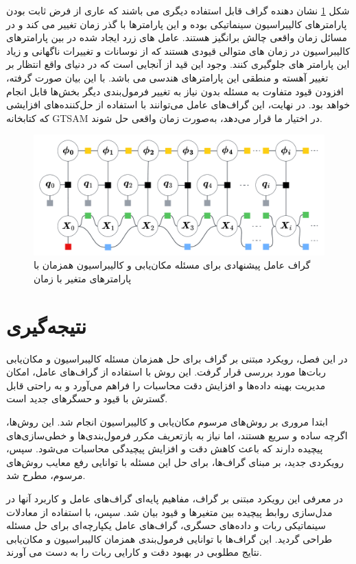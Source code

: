 شکل 
\ref{fig:kinematiclocalizationbasicnonstationatyparam}
نشان دهنده گراف قابل استفاده دیگری می باشند که عاری از فرض ثابت بودن پارامترهای کالیبراسیون سینماتیکی بوده و این پارامترها با گذر زمان تغییر می کند و در مسائل زمان واقعی چالش برانگیز هستند. عامل های زرد ایجاد شده در بین پارامترهای کالیبراسیون در زمان های متوالی قیودی هستند که از نوسانات و تغییرات ناگهانی و زیاد این پارامتر های جلوگیری کنند. وجود این قید از آنجایی است که در دنیای واقع انتظار بر تغییر آهسته و منطقی این پارامترهای هندسی می باشد. 
با این بیان صورت گرفته، افزودن قیود متفاوت به مسئله بدون نیاز به تغییر فرمول‌بندی دیگر بخش‌ها قابل انجام خواهد بود. در نهایت، این گراف‌های عامل می‌توانند با استفاده از حل‌کننده‌های افزایشی که کتابخانه GTSAM در اختیار ما قرار می‌دهد، به‌صورت زمان واقعی حل شوند. 
\begin{figure}[b]
	\centering
	\includegraphics[width=0.8\linewidth]{img/Kinematic_localization_basic_nonstationaty_param}
	\caption{گراف عامل پیشنهادی برای مسئله مکان‌یابی و کالیبراسیون همزمان با پارامتر‌های متغیر با زمان}
	\label{fig:kinematiclocalizationbasicnonstationatyparam}
\end{figure}


\section{نتیجه‌گیری}

در این فصل، رویکرد مبتنی بر گراف برای حل همزمان مسئله کالیبراسیون و مکان‌یابی ربات‌ها مورد بررسی قرار گرفت. این روش با استفاده از گراف‌های عامل، امکان مدیریت بهینه داده‌ها و افزایش دقت محاسبات را فراهم می‌آورد و به راحتی قابل گسترش با قیود و حسگرهای جدید است.

ابتدا مروری بر روش‌های مرسوم مکان‌یابی و کالیبراسیون انجام شد. این روش‌ها، اگرچه ساده و سریع هستند، اما نیاز به بازتعریف مکرر فرمول‌بندی‌ها و خطی‌سازی‌های پیچیده دارند که باعث کاهش دقت و افزایش پیچیدگی محاسبات می‌شود. سپس، رویکردی جدید، بر مبنای گراف‌ها، برای حل این مسئله با توانایی رفع معایب روش‌های مرسوم، مطرح شد.

در معرفی این رویکرد مبتنی بر گراف، مفاهیم پایه‌ای گراف‌های عامل و کاربرد آنها در مدل‌سازی روابط پیچیده بین متغیرها و قیود بیان شد. سپس، با استفاده از معادلات سینماتیکی ربات و داده‌های حسگری، گراف‌های عامل یکپارچه‌ای برای حل مسئله طراحی گردید. این گراف‌ها با توانایی فرمول‌بندی همزمان کالیبراسیون و مکان‌یابی نتایج مطلوبی در بهبود دقت و کارایی ربات را به دست می آورند.



 
 
 
 